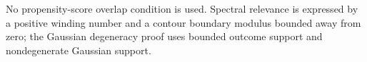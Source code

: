 No propensity-score overlap condition is used.  Spectral relevance is expressed by a positive winding number and a contour boundary modulus bounded away from zero; the Gaussian degeneracy proof uses bounded outcome support and nondegenerate Gaussian support.